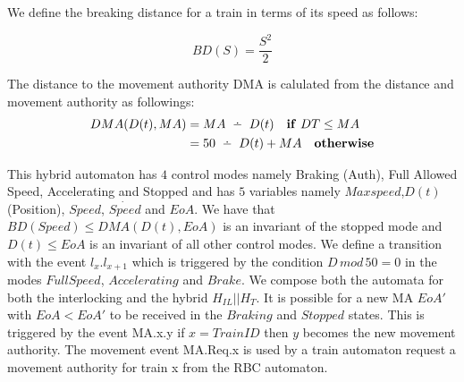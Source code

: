 \begin{mydef}
We define the breaking distance for a train in terms of its speed as follows:

$$BD(S) = \frac{S^2}{2} $$


\end{mydef}

\medskip

\begin{mydef}[Distance to MA]

The distance to the movement authority DMA is calulated from the distance and movement authority as followings:
\begin{align*}
DMA(D(t), MA) & = MA \Monus D(t) \quad \mathbf{if} \ DT \leq MA \\
                         & = 50 \Monus D(t) + MA \quad \mathbf{otherwise}
\end{align*}



\end{mydef}

This hybrid automaton has $4$ control modes namely Braking (Auth), Full Allowed Speed, Accelerating and Stopped and has $5$ variables namely $Maxspeed$,$D(t)$ (Position),  $Speed$, $\dot{Speed}$ and $EoA$. We have that $ BD(Speed) \leq DMA(D(t), EoA)$ is an invariant of the stopped mode and $D(t) \leq EoA$ is an invariant of all other control modes.
We define a transition with the event $l_x.l_{x+1}$ which is triggered by the condition $D \,  mod \, 50 = 0$ in the modes $Full Speed$, $Accelerating$ and $Brake$. 
   We compose both the automata for both the interlocking and the hybrid $H_{IL} || H_{T}$. It is possible for a new MA $EoA'$ with $EoA < EoA'$ to be received in the $Braking$ and $Stopped$ states.  This is triggered by the event MA.x.y if $x = TrainID$ then $y$ becomes the new movement authority. The movement event MA.Req.x is used by a train automaton request a movement authority for train x from the RBC automaton.



